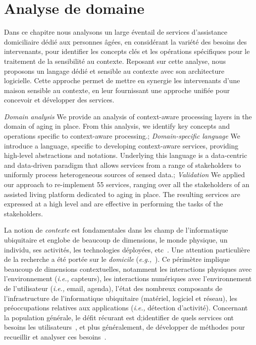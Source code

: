 \chapter{Analyse de domaine}
\begin{preamble}
Dans ce chapitre nous analysons un large éventail de services d'assistance domiciliaire dédié aux personnes âgées, en considérant la variété des besoins des intervenants, pour identifier les concepts clés et les opérations spécifiques pour le traitement de la sensibilité au contexte. Reposant sur cette analyse, nous proposons un langage dédié et sensible au contexte avec son architecture logicielle. Cette approche permet de mettre en synergie les intervenants d'une maison sensible au contexte, en leur fournissant une approche unifiée pour concevoir et développer des services.
\end{preamble}
{
{\em Domain analysis} We provide an analysis of context-aware processing layers in the domain of aging in place. From this analysis, we identify key concepts and operations specific to context-aware processing.;
{\em Domain-specific language} We introduce a language, specific to developing context-aware services, providing high-level abstractions and notations. 
Underlying this language is a data-centric and data-driven paradigm that allows services from a range of stakeholders to uniformly process heterogeneous sources of sensed data.;
{\em Validation} We applied our approach to re-implement 55 services, ranging over all the stakeholders of an assisted living platform dedicated to aging in place. The resulting services are expressed at a high level and are effective in performing the tasks of the stakeholders.
}


La notion de {\em contexte} est fondamentales dans les champ de l'informatique ubiquitaire et englobe de beaucoup de dimensions, le monde physique, un individu, ses activités, les technologies déployées, etc~\cite{bauer2012comparison}.
Une attention particulière de la recherche a été portée sur le {\em domicile} ({\em e.g.,}~\cite{cook2013casas,feminella2014piloteur}). Ce périmètre implique beaucoup de dimensions contextuelles, notamment les interactions physiques avec l'environnement ({\em i.e.,} capteurs), les interactions numériques avec l'environnement de l'utilisateur ({\em i.e.,} email, agenda), l'état des nombreux composants de l'infrastructure de l'informatique ubiquitaire (matériel, logiciel et réseau), les préoccupations relatives aux applications ({\em i.e.,} détection d'activité). Concernant la population générale, le défit récurant est d;identifier de quels services ont besoins les utilisateurs~\cite{brush2011home}, et plus généralement, de développer de méthodes pour recueillir et analyser ces besoins~\cite{coutaz2010disqo}.

